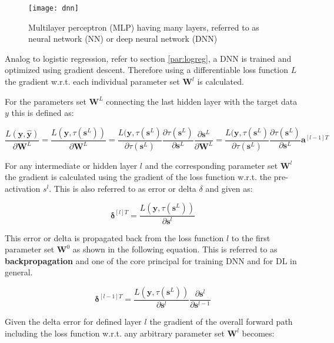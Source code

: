 \documentclass[../main.tex]{subfiles}
\begin{document}
\begin{figure}[H]
    \centering
    \texttt{[image: dnn]}    
    \caption{Multilayer perceptron (MLP) having many layers, referred to as neural network (NN) or deep neural network (DNN)}
    \label{fig:dnn}
\end{figure}

Analog to logistic regression, refer to section \ref{par:logreg}, a DNN is trained and optimized using gradient descent. Therefore using a differentiable loss function $L$ the gradient w.r.t. each individual parameter set $\mathbf{W}^l$ is calculated.

For the parameters set $\mathbf{W}^L$ connecting the last hidden layer with the target data $y$ this is defined as:

\begin{equation}
    \frac{L(\mathbf{y}, \mathbf{\hat{y}})}{\partial \mathbf{W}^L} = 
    \frac{L(\mathbf{y}, \tau(\mathbf{s}^L))}{\partial \mathbf{W}^L} = 
    \frac{L(\mathbf{y}, \tau(\mathbf{s}^L)}{\partial \tau(\mathbf{s}^L)}\frac{\partial\tau(\mathbf{s}^L)}{\partial \mathbf{s}^L} \frac{\partial \mathbf{s}^L}{\partial \mathbf{W}^L} = 
    \frac{L(\mathbf{y}, \tau(\mathbf{s}^L)}{\partial \tau(\mathbf{s}^L)}\frac{\partial\tau(\mathbf{s}^L)}{\partial \mathbf{s}^L} \mathbf{a}^{[l-1]T}
\end{equation}

For any intermediate or hidden layer $l$ and the corresponding parameter set $\mathbf{W}^l$ the gradient is calculated using the gradient of the loss function w.r.t. the pre-activation $s^l$. This is also referred to as error or delta $\delta$ and given as:

\begin{equation}
    \mathbf{\delta}^{[l]T} = \frac{L(\mathbf{y}, \tau(\mathbf{s}^L))}{\partial \mathbf{s}^l} 
\end{equation}

This error or delta is propagated back from the loss function $l$ to the first parameter set $\mathbf{W}^0$ as shown in the following equation. This is referred to as \textbf{backpropagation} and one of the core principal for training DNN and for DL in general.

\begin{equation}
    \mathbf{\delta}^{[l-1]T} = \frac{L(\mathbf{y}, \tau(\mathbf{s}^L))}{\partial \mathbf{s}^l} \frac{\partial \mathbf{s}^l}{\partial \mathbf{s}^{l-1}}
\end{equation}

Given the delta error for defined layer $l$ the gradient of the overall forward path including the loss function w.r.t. any arbitrary parameter set $\mathbf{W}^l$ becomes:
\end{document}
